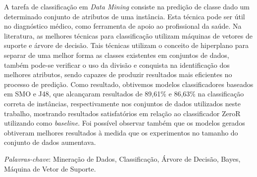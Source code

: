 \documentclass[
	12pt,				%
	openright,			%
	oneside,	
	a4paper,				%
	english,				%
	brazil				%
]{abntex2/abntex2} %
\begin{document}









\setlength{\absparsep}{18pt} %
\begin{resumo}

 	A tarefa de classificação em \textit{Data Mining} consiste na predição de classe dado um determinado conjunto de atributos de uma instância. Esta técnica pode ser útil no diagnóstico médico, como ferramenta de apoio ao profissional da saúde. Na literatura, as melhores técnicas para classificação utilizam máquinas de vetores de suporte e árvore de decisão. Tais técnicas utilizam o conceito de hiperplano para separar de uma melhor forma as classes existentes em conjuntos de dados, também pode-se verificar o uso da divisão e conquista na identificação dos melhores atributos, sendo capazes de produzir resultados mais eficientes no processo de predição. Como resultado, obtivemos modelos classificadores baseados em SMO e J48, que alcançaram resultados de 89,61\% e 86,63\% na classificação correta de instâncias, respectivamente nos conjuntos de dados utilizados neste trabalho, mostrando resultados satisfatórios em relação ao classificador ZeroR utilizando como \textit{baseline}. Foi possível observar também que os modelos gerados obtiveram melhores resultados à medida que os experimentos no tamanho do conjunto de dados aumentava.

 \textit{Palavras-chave}: Mineração de Dados, Classificação, Árvore de Decisão, Bayes, Máquina de Vetor de Suporte.

\end{resumo}
\end{document}
